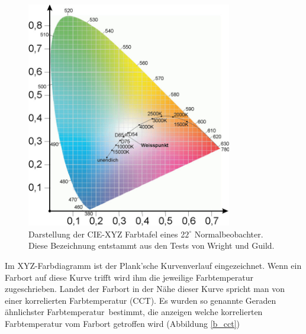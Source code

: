 \begin{figure}[H]     %
\centering
\includegraphics[width=0.8\textwidth]{bilder/xyz1} 
\caption {Darstellung der CIE-XYZ Farbtafel eines 2$2^\circ$ Normalbeobachter. Diese Bezeichnung entstammt aus den Tests von Wright und Guild. \protect\footnotemark}\label{b_xyz1}
\end{figure}


Im XYZ-Farbdiagramm ist der Plank'sche Kurvenverlauf eingezeichnet. Wenn ein Farbort auf diese Kurve trifft wird ihm die jeweilige Farbtemperatur zugeschrieben. Landet der Farbort in der Nähe dieser Kurve spricht man von einer korrelierten Farbtemperatur (CCT).  Es wurden so genannte \glqq Geraden ähnlichster Farbtemperatur\grqq\ bestimmt, die anzeigen welche korrelierten Farbtemperatur vom Farbort getroffen wird (Abbildung \ref{b_cct})    

